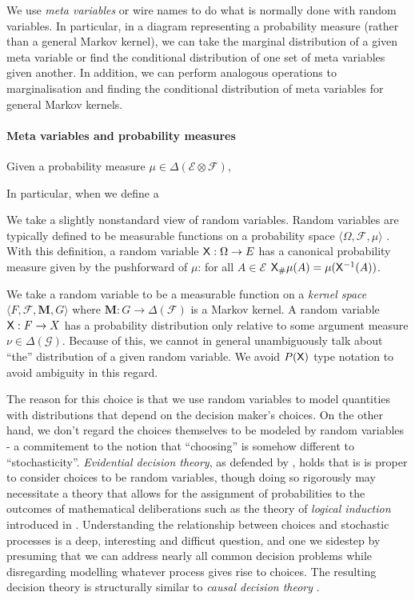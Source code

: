We use \emph{meta variables} or wire names to do what is normally done with random variables. In particular, in a diagram representing a probability measure (rather than a general Markov kernel), we can take the marginal distribution of a given meta variable or find the conditional distribution of one set of meta variables given another. In addition, we can perform analogous operations to marginalisation and finding the conditional distribution of meta variables for general Markov kernels.

\paragraph{Meta variables and probability measures}

Given a probability measure $\mu\in \Delta(\mathcal{E}\otimes\mathcal{F})$, 

In particular, when we define a 

We take a slightly nonstandard view of random variables. Random variables are typically defined to be measurable functions on a probability space $\langle \Omega, \mathcal{F}, \mu\rangle$ \citep{cinlar_probability_2011}. With this definition, a random variable $\mathsf{X}:\Omega\to E$ has a canonical probability measure given by the pushforward of $\mu$: for all $A\in\mathscr{E}$ $\mathsf{X}_\# \mu(A) = \mu(\mathsf{X}^{-1}(A))$.

We take a random variable to be a measurable function on a \emph{kernel space} $\langle F,\mathcal{F},\mathbf{M}, G\rangle$ where $\mathbf{M}:G\to \Delta(\mathcal{F})$ is a Markov kernel. A random variable $\mathsf{X}:F\to X$ has a probability distribution only relative to some argument measure $\nu\in\Delta(\mathcal{G})$. Because of this, we cannot in general unambiguously talk about ``the'' distribution of a given random variable. We avoid $P(\mathsf{X})$ type notation to avoid ambiguity in this regard. 

The reason for this choice is that we use random variables to model quantities with distributions that depend on the decision maker's choices. On the other hand, we don't regard the choices themselves to be modeled by random variables - a commitement to the notion that ``choosing'' is somehow different to ``stochasticity''. \emph{Evidential decision theory}, as defended by \citet{jeffrey_logic_1981}, holds that is is proper to consider choices to be random variables, though doing so rigorously may necessitate a theory that allows for the assignment of probabilities to the outcomes of mathematical deliberations such as the theory of \emph{logical induction} introduced in \citet{garrabrant_logical_2017}. Understanding the relationship between choices and stochastic processes is a deep, interesting and difficut question, and one we sidestep by presuming that we can address nearly all common decision problems while disregarding modelling whatever process gives rise to choices. The resulting decision theory is structurally similar to \emph{causal decision theory} \citep{lewis_causal_1981}.

